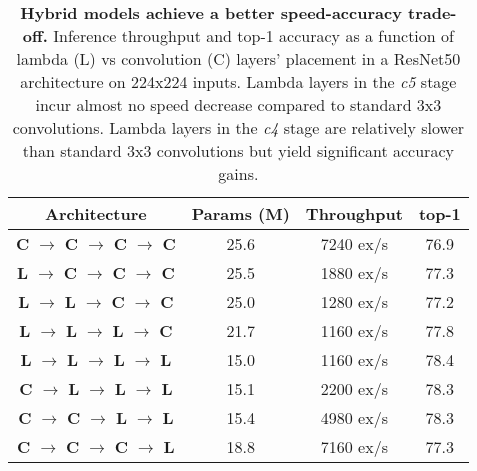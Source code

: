 \documentclass{article} \usepackage{iclr2021_conference,times}
\begin{document}
\begin{table}[h]
  \begin{center}
  \small
  \begin{tabular}{cccc}
    \toprule
    Architecture & Params (M) & Throughput & top-1 \\
    \midrule
    \textbf{C} $\rightarrow$ \textbf{C} $\rightarrow$ \textbf{C} $\rightarrow$ \textbf{C} & 25.6 & 7240 ex/s & 76.9 \\
    \textbf{L} $\rightarrow$ \textbf{C} $\rightarrow$ \textbf{C} $\rightarrow$ \textbf{C} & 25.5 & 1880 ex/s & 77.3 \\
    \textbf{L} $\rightarrow$ \textbf{L} $\rightarrow$ \textbf{C} $\rightarrow$ \textbf{C} & 25.0 & 1280 ex/s & 77.2 \\
    \textbf{L} $\rightarrow$ \textbf{L} $\rightarrow$ \textbf{L} $\rightarrow$ \textbf{C} & 21.7 & 1160 ex/s & 77.8 \\
    \midrule
    \textbf{L} $\rightarrow$ \textbf{L} $\rightarrow$ \textbf{L} $\rightarrow$ \textbf{L} & 15.0 & 1160 ex/s & 78.4 \\
    \textbf{C} $\rightarrow$ \textbf{L} $\rightarrow$ \textbf{L} $\rightarrow$ \textbf{L} & 15.1 & 2200 ex/s & 78.3 \\
    \textbf{C} $\rightarrow$ \textbf{C} $\rightarrow$ \textbf{L} $\rightarrow$ \textbf{L} & 15.4 & 4980 ex/s & 78.3 \\
    \textbf{C} $\rightarrow$ \textbf{C} $\rightarrow$ \textbf{C} $\rightarrow$ \textbf{L} & 18.8 & 7160 ex/s & 77.3 \\
    \bottomrule
  \end{tabular}
  \caption{
  \textbf{Hybrid models achieve a better speed-accuracy trade-off.} 
  Inference throughput and top-1 accuracy as a function of lambda (L) vs convolution (C) layers' placement in a ResNet50 architecture on 224x224 inputs.
  Lambda layers in the \emph{c5} stage incur almost no speed decrease compared to standard 3x3 convolutions.
  Lambda layers in the \emph{c4} stage are relatively slower than standard 3x3 convolutions but yield significant accuracy gains.
  }
  \label{tab:hybrid_lambdanetworks}
\end{center}
\end{table}
\end{document}
